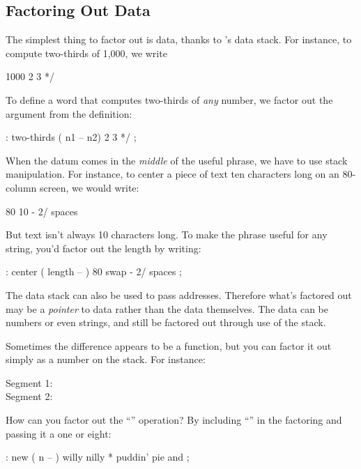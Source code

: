 \subsection{Factoring Out Data}
The simplest thing to factor out is data, thanks to \Forth{}'s data
stack. For instance, to compute two-thirds of 1,000, we write

\begin{Code}
1000 2 3 */
\end{Code}
To define a word that computes two-thirds of \emph{any} number,
we factor out the argument from the definition:

\begin{Code}
: two-thirds  ( n1 -- n2)  2 3 */ ;
\end{Code}
When the datum comes in the \emph{middle} of the useful phrase, we
have to use stack manipulation. For instance, to center a piece of
text ten characters long on an 80-column screen, we would write:

\begin{Code}
80  10 -   2/ spaces
\end{Code}
But text isn't always 10 characters long. To make the phrase useful
for any string, you'd factor out the length by writing:

\begin{Code}
: center ( length -- ) 80  swap -  2/ spaces ;
\end{Code}
The data stack can also be used to pass addresses. Therefore what's
factored out may be a \emph{pointer} to data rather than the data
themselves. The data can be numbers or even strings, and still be
factored out through use of the stack.

Sometimes the difference appears to be a function, but you can factor
it out simply as a number on the stack. For instance:

\begin{description}
\item[Segment 1:] 
\item[Segment 2:] 
\end{description}

\noindent How can you factor out the ``'' operation?
By including ``\forth{*}'' in the factoring and passing it a one or eight:

\begin{Code}
: new  ( n -- )  willy nilly  *  puddin' pie and ;
\end{Code}


